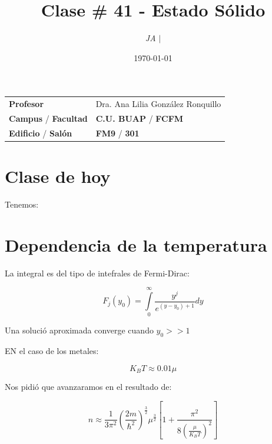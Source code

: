 \documentclass{article}
\title{Clase \# 41 - Estado Sólido}
\author{\emph{JA} $\boldsymbol{\mid}$}
\date{\today}
\begin{document}
\maketitle



\begin{mybox}
\noindent\begin{tabular}{@{}ll}
	{\bfseries{Profesor}} & Dra. Ana Lilia González Ronquillo\\
	\textcolor{prussianblue}{\bfseries{Campus}} / \textcolor{trueblue}{\bfseries{Facultad}}  & \textcolor{prussianblue}{\bfseries{C.U. BUAP}} /  \textcolor{trueblue}{\bfseries{FCFM}} \\
	\textcolor{prussianblue}{\bfseries{Edificio}} /  \textcolor{trueblue}{\bfseries{Salón}}    & 	\textcolor{prussianblue}{\bfseries{FM9}} /  \textcolor{trueblue}{\bfseries{301}}   
\end{tabular} 
\end{mybox} \vspace{1cm}

\tableofcontents

\vspace{2cm}


\section{Clase de hoy}


Tenemos:


\section{\textcolor{orange(colorwheel)}{Dependencia de la temperatura}}




La integral es del tipo de intefrales de Fermi-Dirac:


\[  F_{j}(y_{0}) = \int\limits_{0}^{\infty}  \frac{ y^{j}  }{ e^{ (y-y_{0}) +1 }  } dy   \]

Una solució aproximada converge cuando $y_{0}>>1$


EN el caso de los metales:

\[  K_{B}T \approx 0\text{.}01\mu \]


Nos pidió que avanzaramos en el resultado de:


\[   n \approx \frac{1}{3\pi^{2}} \left(  \frac{2m}{\hbar^{2}}  \right)^{\frac{3}{2}} \mu^{\frac{3}{2}} \left[   1+ \frac{ \pi^{2}  }{  8 \left(  \frac{ \mu }{ K_{B}T }  \right)^{2} }    \right]   \]
\end{document}
